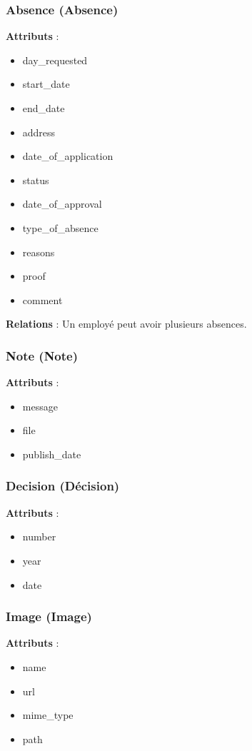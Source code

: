 \subsubsection{Absence (Absence)}
\textbf{Attributs} :
\begin{itemize}
    \item day\_requested
    \item start\_date
    \item end\_date
    \item address
    \item date\_of\_application
    \item status
    \item date\_of\_approval
    \item type\_of\_absence
    \item reasons
    \item proof
    \item comment
\end{itemize}
\textbf{Relations} : Un employé peut avoir plusieurs absences.

\subsubsection{Note (Note)}
\textbf{Attributs} :
\begin{itemize}
    \item message
    \item file
    \item publish\_date
\end{itemize}

\subsubsection{Decision (Décision)}
\textbf{Attributs} :
\begin{itemize}
    \item number
    \item year
    \item date
\end{itemize}

\subsubsection{Image (Image)}
\textbf{Attributs} :
\begin{itemize}
    \item name
    \item url
    \item mime\_type
    \item path
\end{itemize}

